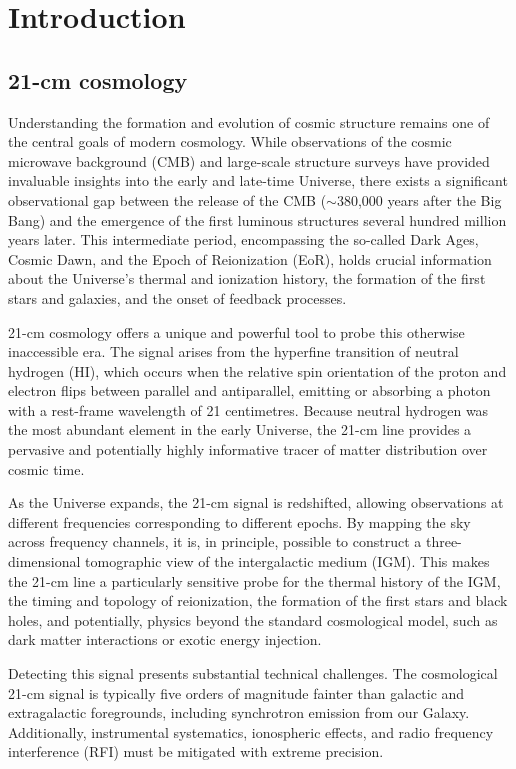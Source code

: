 \documentclass[floats,floatfix,showpacs,amssymb,prd,superscriptaddress,nofootinbib, 11pt]{revtex4-2} %
\begin{document}

\newpage

{\tableofcontents}
\newpage
\section{Introduction}
\subsection{21-cm cosmology}
Understanding the formation and evolution of cosmic structure remains one of the central goals of modern cosmology. While observations of the cosmic microwave background (CMB) and large-scale structure surveys have provided invaluable insights into the early and late-time Universe, there exists a significant observational gap between the release of the CMB ($\sim$380,000 years after the Big Bang) and the emergence of the first luminous structures several hundred million years later. This intermediate period, encompassing the so-called Dark Ages, Cosmic Dawn, and the Epoch of Reionization (EoR), holds crucial information about the Universe's thermal and ionization history, the formation of the first stars and galaxies, and the onset of feedback processes.

21-cm cosmology offers a unique and powerful tool to probe this otherwise inaccessible era. The signal arises from the hyperfine transition of neutral hydrogen (HI), which occurs when the relative spin orientation of the proton and electron flips between parallel and antiparallel, emitting or absorbing a photon with a rest-frame wavelength of 21 centimetres. Because neutral hydrogen was the most abundant element in the early Universe, the 21-cm line provides a pervasive and potentially highly informative tracer of matter distribution over cosmic time.

As the Universe expands, the 21-cm signal is redshifted, allowing observations at different frequencies corresponding to different epochs. By mapping the sky across frequency channels, it is, in principle, possible to construct a three-dimensional tomographic view of the intergalactic medium (IGM). This makes the 21-cm line a particularly sensitive probe for the thermal history of the IGM, the timing and topology of reionization, the formation of the first stars and black holes, and potentially, physics beyond the standard cosmological model, such as dark matter interactions or exotic energy injection.

Detecting this signal presents substantial technical challenges. The cosmological 21-cm signal is typically five orders of magnitude fainter than galactic and extragalactic foregrounds, including synchrotron emission from our Galaxy. Additionally, instrumental systematics, ionospheric effects, and radio frequency interference (RFI) must be mitigated with extreme precision.
\end{document}
